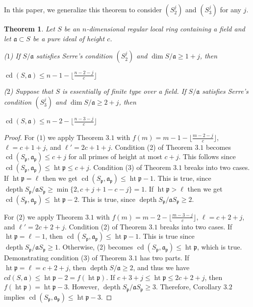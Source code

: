 \documentclass[11pt]{amsart}
\numberwithin{equation}{section}
\newtheorem{theorem}{Theorem}[section]
\theoremstyle{definition}
\theoremstyle{remark}
\newcommand{\cd}{\operatorname{cd}}
\newcommand{\height}{\operatorname{ht}}
\newcommand{\depth}{\operatorname{depth}}
\begin{document}
In this paper, we generalize this theorem to consider $(S_2^j)$ and $(S_3^j)$ for any $j$.

\begin{theorem}
Let $S$ be an $n$-dimensional regular local ring containing a field and let $\mathfrak{a} \subset S$ be a pure ideal of height $c$.

($1$) If $S/\mathfrak{a}$ satisfies Serre's condition $(S_2^j)$ and $\dim S/\mathfrak{a} \geq 1+j$, then

\begin{center}
$\cd (S,\mathfrak{a}) \leq n-1-\lfloor \frac{n-2-j}{c} \rfloor$
\end{center}

($2$) Suppose that $S$ is essentially of finite type over a field. If $S/\mathfrak{a}$ satisfies Serre's condition $(S_3^j)$ and $\dim S/\mathfrak{a} \geq 2+j$, then

\begin{center}
$\cd (S,\mathfrak{a}) \leq n-2-\lfloor \frac{n-3-j}{c} \rfloor$
\end{center}

\end{theorem}

\begin{proof}
For ($1$) we apply Theorem $3.1$ with $f(m) = m-1-\lfloor \frac{m-2-j}{c} \rfloor$, $\ell=c+1+j$, and $\ell' = 2c+1+j$.  Condition (2) of Theorem $3.1$ becomes $\cd (S_\mathfrak{p}, \mathfrak{a}_\mathfrak{p}) \leq c+j$ for all primes of height at most $c+j$.  This follows since $\cd (S_\mathfrak{p},\mathfrak{a}_\mathfrak{p}) \leq \height \mathfrak{p} \leq c+j$.  Condition (3) of Theorem $3.1$ breaks into two cases.  If $\height \mathfrak{p} = \ell$ then we get $\cd (S_\mathfrak{p},\mathfrak{a}_\mathfrak{p}) \leq \height \mathfrak{p} -1$.  This is true, since $\depth S_\mathfrak{p}/\mathfrak{a}S_\mathfrak{p} \geq \min \{2, c+j+1-c-j\} = 1$.  If $\height \mathfrak{p} > \ell$ then we get $\cd (S_\mathfrak{p},\mathfrak{a}_\mathfrak{p}) \leq \height \mathfrak{p} -2$.  This is true, since $\depth S_\mathfrak{p}/\mathfrak{a}S_\mathfrak{p} \geq 2$.  

For ($2$) we apply Theorem $3.1$ with $f(m) = m-2-\lfloor \frac{m-3-j}{c} \rfloor$, $\ell=c+2+j$, and $\ell' = 2c+2+j$.  Condition (2) of Theorem $3.1$ breaks into two cases.  If $\height \mathfrak{p} = \ell -1$, then $\cd (S_\mathfrak{p},\mathfrak{a}_\mathfrak{p}) \leq \height \mathfrak{p} -1$.  This is true since $\depth S_\mathfrak{p}/\mathfrak{a}S_\mathfrak{p} \geq 1$.  Otherwise, (2) becomes $\cd (S_\mathfrak{p},\mathfrak{a}_\mathfrak{p}) \leq \height \mathfrak{p}$, which is true.  Demonstrating condition ($3$) of Theorem $3.1$ has two parts.  If $\height \mathfrak{p} = \ell = c+2+j$, then $\depth S/\mathfrak{a} \geq 2$, and thus we have $cd (S,\mathfrak{a}) \leq \height \mathfrak{p} -2 = f(\height \mathfrak{p})$. If $c+3+j \leq \height \mathfrak{p} \leq 2c+2+j$, then $f(\height \mathfrak{p}) = \height \mathfrak{p} -3$.  However, $\depth S_\mathfrak{p}/\mathfrak{a}S_\mathfrak{p} \geq 3$.  Therefore, Corollary $3.2$ implies $\cd (S_\mathfrak{p}, \mathfrak{a}_\mathfrak{p}) \leq \height \mathfrak{p} -3$.
\end{proof}
\end{document}
